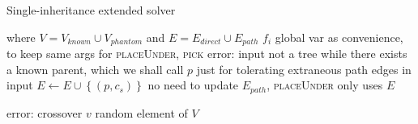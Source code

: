 \begin{algorithm} 
  \caption{Single-inheritance extended solver}
  \label{hiercomp/alg:single:ext}

  \hrulefill

  \begin{algorithmic}[1]
     where $V = V_{known} \cup V_{phantom}$ and $E = E_{direct} \cup E_{path}$
    \State \Global $f_i$ \Comment global var as convenience, to keep same args for \textsc{placeUnder}, \textsc{pick}
        \State error: input not a tree
      \Else
      \EndIf
    \EndFor
         \Comment while there exists a known parent, which we shall call $p$
            \Comment just for tolerating extraneous path edges in input
            \State $E \gets E \cup
            \left\{(p,c_s)\right\}$ \label{hiercomp/lst:line:add}
            \Comment no need to update $E_{path}$, \textsc{placeUnder} only uses $E$
          \EndIf
        \EndWhile
      \EndFor
    \State \Return {} 
    \EndFunction
  \end{algorithmic}

  \hrulefill

  \begin{algorithmic}[1]
     \label{hiercomp/lst:line:priority}
        \State error: crossover %
      \Else
        \State \Return $v$
      \EndIf
    \Else
    \State \Return random element of $V$
    \EndIf
    \EndFunction
  \end{algorithmic}
\end{algorithm} 

